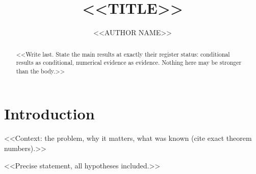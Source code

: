 

\newcommand{\N}{\mathbb{N}}
\newcommand{\Z}{\mathbb{Z}}
\newcommand{\Q}{\mathbb{Q}}
\newcommand{\R}{\mathbb{R}}
\newcommand{\C}{\mathbb{C}}
\DeclareMathOperator{\rank}{rank}
\DeclareMathOperator{\Hom}{Hom}

\title[<<SHORT TITLE>>]{<<TITLE>>}

\author{<<AUTHOR NAME>>}
\address{<<INSTITUTION AND POSTAL ADDRESS>>}





\begin{abstract}
<<Write last. State the main results at exactly their register status:
conditional results as conditional, numerical evidence as evidence. Nothing here
may be stronger than the body.>>
\end{abstract}

\maketitle

\section{Introduction}\label{sec:intro}

<<Context: the problem, why it matters, what was known (cite exact theorem
numbers).>>

\begin{mainthm}\label{thm:A}
<<Precise statement, all hypotheses included.>>
\end{mainthm}

